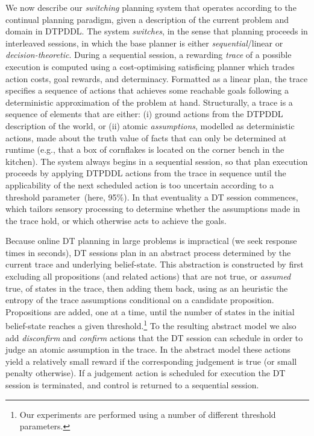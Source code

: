 
We now describe our {\em switching} planning system that operates
according to the continual planning paradigm, given a description of
the current problem and domain in DTPDDL. The system {\em
switches}, in the sense that planning proceeds in interleaved
sessions, in which the base planner is either {\em sequential}/linear
or {\em decision-theoretic}.
During a sequential session, a rewarding {\em trace} of a possible
execution is computed using a cost-optimising satisficing planner
which trades action costs, goal rewards, and determinacy.
Formatted as a linear plan, the trace specifies a sequence of actions
that achieves some reachable goals following a deterministic
approximation of the problem at hand.
Structurally, a trace is a sequence of elements that are either: (i) ground
actions from the DTPDDL description of the world, or (ii) atomic {\em
assumptions}, modelled as deterministic actions, made about the truth
value of facts that can only be determined at runtime (e.g., that a
box of cornflakes is located on the corner bench in the kitchen).
The system always begins in a sequential session, so that plan
execution proceeds by applying DTPDDL actions from the trace in
sequence until the applicability of the next scheduled action is too
uncertain according to a threshold parameter~(here, 95\%). In that
eventuality a DT session commences, which tailors sensory processing
to determine whether the assumptions made in the trace hold, or which
otherwise acts to achieve the goals. 


Because online DT planning in large problems is impractical (we seek
response times in seconds), DT sessions plan in an abstract process
determined by the current trace and underlying belief-state. This
abstraction is constructed by first excluding all propositions (and
related actions) that are not true, or {\em assumed } true, of states
in the trace, then adding them back, using as an heuristic the entropy
of the trace assumptions conditional on a candidate
proposition. Propositions are added, one at a time, until the number
of states in the initial belief-state reaches a given
threshold.\footnote{Our experiments are performed using a number of
different threshold parameters.}  To the resulting abstract model we
also add {\em disconfirm} and {\em confirm} actions that the
DT session can schedule in order to judge an atomic assumption
in the trace. In the abstract model these actions yield a relatively
small reward if the corresponding judgement is true (or small penalty
otherwise). If a judgement action is scheduled for execution the
DT session is terminated, and control is returned to a
sequential session.


